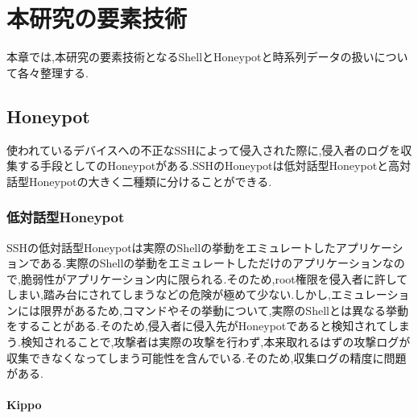 \chapter{本研究の要素技術}
\label{tech}

本章では,本研究の要素技術となるShellとHoneypotと時系列データの扱いについて各々整理する.

\section{Honeypot}

使われているデバイスへの不正なSSHによって侵入された際に,侵入者のログを収集する手段としてのHoneypotがある.SSHのHoneypot\cite{honeypot}は低対話型Honeypotと高対話型Honeypotの大きく二種類に分けることができる.\\


\subsection{低対話型Honeypot}
\label{tech:LowInteractionHoneypot}

SSHの低対話型Honeypotは実際のShellの挙動をエミュレートしたアプリケーションである.実際のShellの挙動をエミュレートしただけのアプリケーションなので,脆弱性がアプリケーション内に限られる.そのため,root権限を侵入者に許してしまい,踏み台にされてしまうなどの危険が極めて少ない.しかし,エミュレーションには限界があるため,コマンドやその挙動について,実際のShellとは異なる挙動をすることがある.そのため,侵入者に侵入先がHoneypotであると検知されてしまう.検知されることで,攻撃者は実際の攻撃を行わず,本来取れるはずの攻撃ログが収集できなくなってしまう可能性を含んでいる.そのため,収集ログの精度に問題がある.

\subsubsection{Kippo}
\label{tech:Kippo}

